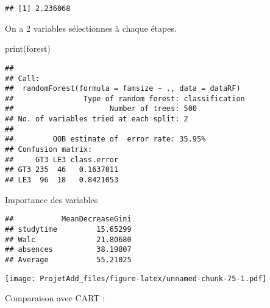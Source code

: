 \documentclass[
]{article}
\newenvironment{Shaded}{\begin{snugshade}}{\end{snugshade}}
\newcommand{\AttributeTok}[1]{\textcolor[rgb]{0.77,0.63,0.00}{#1}}
\newcommand{\FunctionTok}[1]{\textcolor[rgb]{0.00,0.00,0.00}{#1}}
\newcommand{\NormalTok}[1]{#1}
\newcommand{\OtherTok}[1]{\textcolor[rgb]{0.56,0.35,0.01}{#1}}
\newcommand{\SpecialCharTok}[1]{\textcolor[rgb]{0.00,0.00,0.00}{#1}}
\newcommand{\StringTok}[1]{\textcolor[rgb]{0.31,0.60,0.02}{#1}}
\begin{document}
\begin{verbatim}
## [1] 2.236068
\end{verbatim}

On a 2 variables sélectionnes à chaque étapes.

\begin{Shaded}
\begin{Highlighting}[]
\FunctionTok{print}\NormalTok{(forest)}
\end{Highlighting}
\end{Shaded}

\begin{verbatim}
## 
## Call:
##  randomForest(formula = famsize ~ ., data = dataRF) 
##                Type of random forest: classification
##                      Number of trees: 500
## No. of variables tried at each split: 2
## 
##         OOB estimate of  error rate: 35.95%
## Confusion matrix:
##     GT3 LE3 class.error
## GT3 235  46   0.1637011
## LE3  96  18   0.8421053
\end{verbatim}

Importance des variables

\begin{Shaded}
\end{Shaded}

\begin{verbatim}
##           MeanDecreaseGini
## studytime         15.65299
## Walc              21.80680
## absences          38.19807
## Average           55.21025
\end{verbatim}

\begin{Shaded}
\end{Shaded}

\texttt{[image: ProjetAdd\_files/figure-latex/unnamed-chunk-75-1.pdf]}

Comparaison avec CART :

\begin{Shaded}
\end{Shaded}
\end{document}

